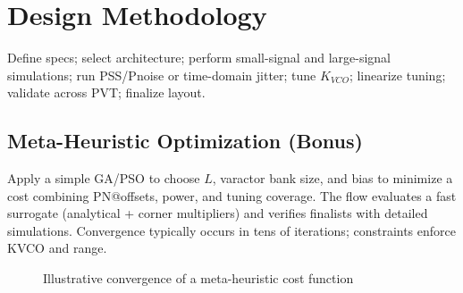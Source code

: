 \chapter{Design Methodology}
{\sloppy
Define specs; select architecture; perform small-signal and large-signal simulations; run PSS/Pnoise or time-domain jitter; tune \(K_{VCO}\); linearize tuning; validate across PVT; finalize layout.\par}

\section{Meta-Heuristic Optimization (Bonus)}
Apply a simple GA/PSO to choose \(L\), varactor bank size, and bias to minimize a cost combining PN@offsets, power, and tuning coverage. The flow evaluates a fast surrogate (analytical + corner multipliers) and verifies finalists with detailed simulations. Convergence typically occurs in tens of iterations; constraints enforce KVCO and range.

\begin{figure}[H]
  \centering
  \caption{Illustrative convergence of a meta-heuristic cost function}
\end{figure}

